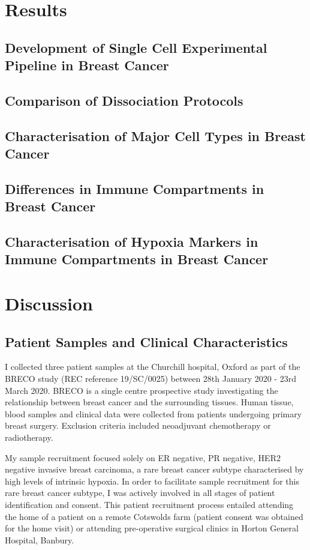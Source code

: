 \section{Results}

\subsection{Development of Single Cell Experimental Pipeline in Breast Cancer}
\subsection{Comparison of Dissociation Protocols}
\subsection{Characterisation of Major Cell Types in Breast Cancer}
\subsection{Differences in Immune Compartments in Breast Cancer}
\subsection{Characterisation of Hypoxia Markers in Immune Compartments in Breast Cancer}


\section{Discussion}

\subsection{Patient Samples and Clinical Characteristics}
I collected three patient samples at the Churchill hospital, Oxford as part of the BRECO study (REC reference 19/SC/0025) between 28th January 2020 - 23rd March 2020. BRECO is a single centre prospective study investigating the relationship between breast cancer and the surrounding tissues. Human tissue, blood samples and clinical data were collected from patients undergoing primary breast surgery. Exclusion criteria included neoadjuvant chemotherapy or radiotherapy.


My sample recruitment focused solely on ER negative, PR negative, HER2 negative invasive breast carcinoma, a rare breast cancer subtype characterised by high levels of intrinsic hypoxia. In order to facilitate sample recruitment for this rare breast cancer subtype, I was actively involved in all stages of patient identification and consent. This patient recruitment process entailed attending the home of a patient on a remote Cotswolds farm (patient consent was obtained for the home visit) or attending pre-operative surgical clinics in Horton General Hospital, Banbury.



